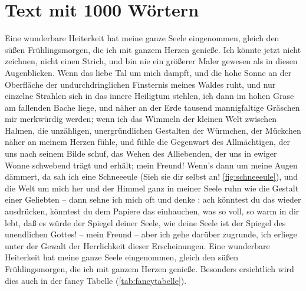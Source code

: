 \documentclass{scrreprt}
\begin{document}
		\section{Text mit 1000 Wörtern \cite{ref1}} 
		Eine wunderbare Heiterkeit hat meine ganze Seele eingenommen, gleich den süßen Frühlingsmorgen, die ich mit ganzem Herzen genieße. 
		 Ich könnte jetzt nicht zeichnen, nicht einen Strich, und bin nie ein größerer Maler gewesen als in diesen Augenblicken. Wenn das liebe Tal um mich dampft, und die hohe Sonne an der Oberfläche der undurchdringlichen Finsternis meines Waldes ruht, und nur einzelne Strahlen sich in das innere Heiligtum stehlen, ich dann im hohen Grase am fallenden Bache liege, und näher an der Erde tausend mannigfaltige Gräschen mir merkwürdig werden; wenn ich das Wimmeln der kleinen Welt zwischen Halmen, die unzähligen, unergründlichen Gestalten der Würmchen, der Mückchen näher an meinem Herzen fühle, und fühle die Gegenwart des Allmächtigen, der uns nach seinem Bilde schuf, das Wehen des Alliebenden, der uns in ewiger Wonne schwebend trägt und erhält; mein Freund! Wenn’s dann um meine Augen dämmert, da sah ich eine Schneeeule (Sieh sie dir selbst an! \ref{fig:schneeeule}), und die Welt um mich her und der Himmel ganz in meiner Seele ruhn wie die Gestalt einer Geliebten – dann sehne ich mich oft und denke : ach könntest du das wieder ausdrücken, könntest du dem Papiere das einhauchen, was so voll, so warm in dir lebt, daß es würde der Spiegel deiner Seele, wie deine Seele ist der Spiegel des unendlichen Gottes! – mein Freund – aber ich gehe darüber zugrunde, ich erliege unter der Gewalt der Herrlichkeit dieser Erscheinungen. Eine wunderbare Heiterkeit hat meine ganze Seele eingenommen, gleich den süßen Frühlingsmorgen, die ich mit ganzem Herzen genieße.
		  Besonders ersichtlich wird dies auch in der fancy Tabelle (\ref{tab:fancytabelle}).\\
		
\end{document}
